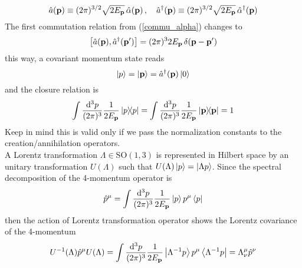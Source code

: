 \begin{equation}
   \hat{a}(\vb{p})\equiv(2\pi)^{3/2}\sqrt{2E_{\vb{p}}}\,\hat{\alpha}(\vb{p})\,,\quad\hat{a}^\dagger(\vb{p})\equiv(2\pi)^{3/2}\sqrt{2E_{\vb{p}}}\,\hat{\alpha}^\dagger(\vb{p})
   \label{covariant_creators}
\end{equation}
The first commutation relation from (\ref{commu_alpha}) changes to
\begin{equation}
    \comm{\hat{a}(\vb{p})}{\hat{a}^\dagger(\vb{p}^\prime)}=(2\pi)^32E_{\vb{p}}\,\delta(\vb{p}-\vb{p}^\prime)
    \label{commu_a}
\end{equation}
this way, a covariant momentum state reads
\begin{equation}
    \ket{p}=\ket{\vb{p}}=\hat{a}^\dagger(\vb{p})\ket{0}
\end{equation}
and the closure relation is
\begin{equation}
    \int\frac{\dd^3p}{(2\pi)^3}\frac{1}{2E_{\vb{p}}}\dyad{p}=\int\frac{\dd^3p}{(2\pi)^3}\frac{1}{2E_{\vb{p}}}\dyad{\vb{p}}=1
\end{equation}
Keep in mind this is valid only if we pass the normalization constants to the creation/annihilation operators.\\

A Lorentz transformation $\Lambda\in\text{SO}(1,3)$  is represented in Hilbert space by an unitary transformation $U(\Lambda)$ such that $U(\Lambda)\ket{p}=\ket{\Lambda p}$. Since the spectral decomposition of the 4-momentum operator is
\begin{equation}
    \hat{p}^\mu=\int\frac{\dd^3p}{(2\pi)^3}\frac{1}{2E_{\vb{p}}}\ket{p}p^\mu\bra{p}
\end{equation}
then the action of Lorentz transformation operator shows the Lorentz covariance of the 4-momentum
\begin{equation}
    U^{-1}(\Lambda)\hat{p}^\mu U(\Lambda)=\int\frac{\dd^3p}{(2\pi)^3}\frac{1}{2E_{\vb{p}}}\ket{\Lambda^{-1}p}p^\mu\bra{\Lambda^{-1}p}=\Lambda^\mu_\nu\hat{p}^\nu
\end{equation}

